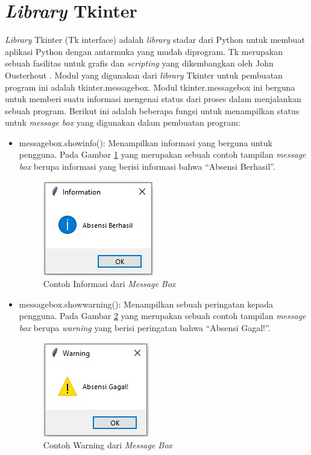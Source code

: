 \section{\textit{Library} Tkinter}
\textit{Library} Tkinter (Tk interface) adalah \textit{library} stadar dari Python untuk membuat aplikasi Python dengan antarmuka yang mudah diprogram. Tk merupakan sebuah fasilitas untuk grafis dan \textit{scripting} yang dikembangkan oleh John Ousterhout {\cite{tkinter}}. Modul yang digunakan dari \textit{library} Tkinter untuk pembuatan program ini adalah tkinter.messagebox. Modul tkinter.messagebox ini berguna untuk memberi suatu informasi mengenai status dari proses dalam menjalankan sebuah program. Berikut ini adalah beberapa fungsi untuk menampilkan status untuk \textit{message box} yang digunakan dalam pembuatan program:
\begin{itemize}
	\item messagebox.showinfo(): Menampilkan informasi yang berguna untuk pengguna. Pada Gambar \ref{fig:infoBox} yang merupakan sebuah contoh tampilan \textit{message box} berupa informasi yang berisi informasi bahwa ``Absensi Berhasil''. 
	\begin{figure}[H]
		\centering
		\includegraphics[scale=0.9]{Gambar/infoBox.jpg}
		\caption{Contoh Informasi dari \textit{Message Box}} 
		\label{fig:infoBox}
	\end{figure}
	\item messagebox.showwarning(): Menampilkan sebuah peringatan kepada pengguna.  Pada Gambar \ref{fig:warningBox} yang merupakan sebuah contoh tampilan \textit{message box} berupa \textit{warning} yang berisi peringatan bahwa ``Absensi Gagal!''. 
	\begin{figure}[H]
		\centering
		\includegraphics[scale=0.9]{Gambar/warningBox.jpg}
		\caption{Contoh Warning dari \textit{Message Box}} 
		\label{fig:warningBox}
	\end{figure}
\end{itemize}

